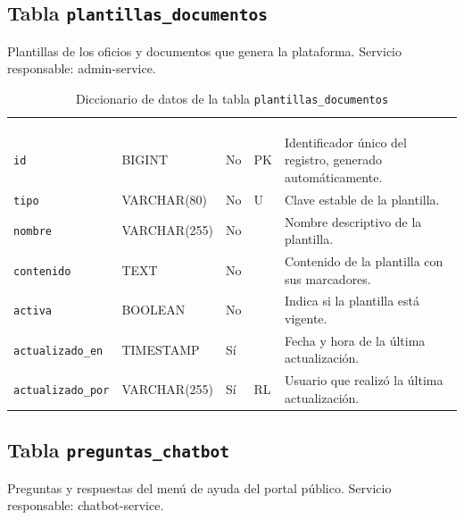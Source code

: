 \subsection{Tabla \texttt{plantillas\_documentos}}
Plantillas de los oficios y documentos que genera la plataforma. Servicio responsable: admin-service.


\footnotesize
\renewcommand{\arraystretch}{1.15}
\setlength{\tabcolsep}{4pt}
\begin{longtable}{|L{3.9cm}|L{2.4cm}|L{0.9cm}|L{1.2cm}|L{6.6cm}|}
	\hiderowcolors\caption{Diccionario de datos de la tabla \texttt{plantillas\_documentos}}
	\label{tab:dic_plantillas_documentos} \\ \showrowcolors
	\hline
	 &  &  &  &  \\
	\hline
	\endfirsthead
	\hline
	 &  &  &  &  \\
	\hline
	\endhead
		\texttt{id} & BIGINT & No & PK & Identificador único del registro, generado automáticamente. \\ \hline
		\texttt{tipo} & VARCHAR(80) & No & U & Clave estable de la plantilla. \\ \hline
		\texttt{nombre} & VARCHAR(255) & No &  & Nombre descriptivo de la plantilla. \\ \hline
		\texttt{contenido} & TEXT & No &  & Contenido de la plantilla con sus marcadores. \\ \hline
		\texttt{activa} & BOOLEAN & No &  & Indica si la plantilla está vigente. \\ \hline
		\texttt{actualizado\_\allowbreak{}en} & TIMESTAMP & Sí &  & Fecha y hora de la última actualización. \\ \hline
		\texttt{actualizado\_\allowbreak{}por} & VARCHAR(255) & Sí & RL & Usuario que realizó la última actualización. \\ \hline
\end{longtable}
\normalsize
\setlength{\tabcolsep}{6pt}
\renewcommand{\arraystretch}{1}

\subsection{Tabla \texttt{preguntas\_chatbot}}
Preguntas y respuestas del menú de ayuda del portal público. Servicio responsable: chatbot-service.


